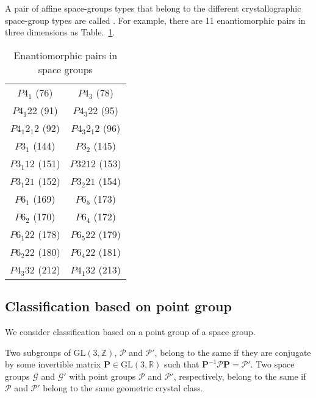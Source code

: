 A pair of affine space-groups types that belong to the different crystallographic space-group types are called .
For example, there are 11 enantiomorphic pairs in three dimensions as Table.~\ref{table:enantiomorphic-pairs-3d}.

\begin{table}[htb]
  \centering
  \caption{Enantiomorphic pairs in space groups}
  \label{table:enantiomorphic-pairs-3d}
  \begin{tabular}[h]{cc}
    \hline\hline
    $P 4_{1}$ (76)         & $P 4_{3}$ (78) \\
    $P 4_{1} 2 2$ (91)     & $P 4_{3} 2 2$ (95) \\
    $P 4_{1} 2_{1} 2$ (92) & $P 4_{3} 2_{1} 2$ (96) \\
    $P 3_{1}$ (144)        & $P 3_{2}$ (145) \\
    $P 3_{1} 1 2$ (151)    & $P 3{2} 1 2$ (153) \\
    $P 3_{1} 2 1$ (152)    & $P 3_{2} 2 1$ (154) \\
    $P 6_{1}$ (169)        & $P 6_{5}$ (173) \\
    $P 6_{2}$ (170)        & $P 6_{4}$ (172) \\
    $P 6_{1} 2 2$ (178)    & $P 6_{5} 2 2$ (179) \\
    $P 6_{2} 2 2$ (180)    & $P 6_{4} 2 2$ (181) \\
    $P 4_{3} 3 2$ (212)    & $P 4_{1} 3 2$ (213) \\
    \hline\hline
  \end{tabular}
\end{table}

\subsection{\label{sec:geometric-class}Classification based on point group}

We consider classification based on a point group of a space group.

\begin{screen}
  \begin{defn}
    Two subgroups of $\mathrm{GL}(3, \mathbb{Z})$, $\mathcal{P}$ and $\mathcal{P}'$, belong to the same  if they are conjugate by some invertible matrix $\bm{P} \in \mathrm{GL}(3, \mathbb{R})$ such that $\bm{P}^{-1} \mathcal{P} \bm{P} = \mathcal{P}'$.
    Two space groups $\mathcal{G}$ and $\mathcal{G}'$ with point groups $\mathcal{P}$ and $\mathcal{P}'$, respectively, belong to the same  if $\mathcal{P}$ and $\mathcal{P}'$ belong to the same geometric crystal class.
  \end{defn}
\end{screen}

